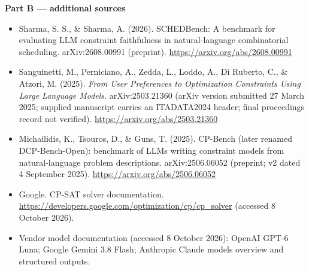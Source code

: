 \documentclass[
  11pt,a4paper,oneside]{report}
\begin{document}
\noindent\textbf{Part B --- additional sources}
\begin{itemize}\setlength{\itemsep}{3pt}
\item Sharma, S. S., \& Sharma, A. (2026). SCHEDBench: A benchmark for evaluating LLM constraint faithfulness in natural-language combinatorial scheduling. arXiv:2608.00991 (preprint). \url{https://arxiv.org/abs/2608.00991}
\item Sanguinetti, M., Perniciano, A., Zedda, L., Loddo, A., Di Ruberto, C., \& Atzori, M. (2025). \emph{From User Preferences to Optimization Constraints Using Large Language Models}. arXiv:2503.21360 (arXiv version submitted 27 March 2025; supplied manuscript carries an ITADATA2024 header; final proceedings record not verified). \url{https://arxiv.org/abs/2503.21360}
\item Michailidis, K., Tsouros, D., \& Guns, T. (2025). CP-Bench (later renamed DCP-Bench-Open): benchmark of LLMs writing constraint models from natural-language problem descriptions. arXiv:2506.06052 (preprint; v2 dated 4 September 2025). \url{https://arxiv.org/abs/2506.06052}
\item Google. CP-SAT solver documentation. \url{https://developers.google.com/optimization/cp/cp_solver} (accessed 8 October 2026).
\item Vendor model documentation (accessed 8 October 2026): OpenAI GPT-6 Luna; Google Gemini 3.8 Flash; Anthropic Claude models overview and structured outputs.
\end{itemize}
\end{document}
